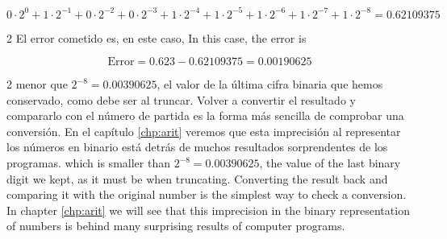  \begin{equation*}
0\cdot 2^{0}+1\cdot 2^{-1}+0\cdot 2^{-2}+ 0\cdot 2^{-3}+1\cdot 2^{-4}+1\cdot 2^{-5}+ 1\cdot 2^{-6}+1\cdot 2^{-7}+1\cdot 2^{-8}=0.62109375
\end{equation*}
\begin{paracol}{2}
El error cometido es, en este caso,
\switchcolumn
In this case, the error is
\end{paracol}
\begin{equation*}
\text{Error}=0.623-0.62109375=0.00190625
\end{equation*}
\begin{paracol}{2}
menor que $2^{-8}=0.00390625$, el valor de la última cifra binaria que hemos conservado, como debe ser al truncar. Volver a convertir el resultado y compararlo con el número de partida es la forma más sencilla de comprobar una conversión. En el capítulo \ref{chp:arit} veremos que esta imprecisión al representar los números en binario está detrás de muchos resultados sorprendentes de los programas.
\switchcolumn
which is smaller than $2^{-8}=0.00390625$, the value of the last binary digit we kept, as it must be when truncating. Converting the result back and comparing it with the original number is the simplest way to check a conversion. In chapter \ref{chp:arit} we will see that this imprecision in the binary representation of numbers is behind many surprising results of computer programs.
\end{paracol}

